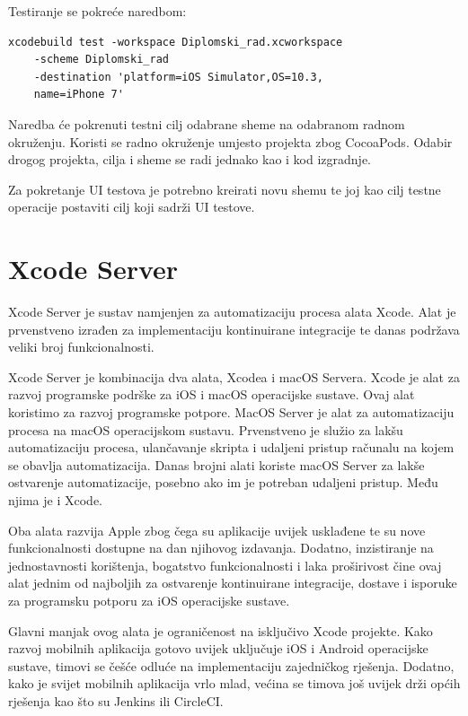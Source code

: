 \documentclass[times, utf8, diplomski, numeric]{fer}
\begin{document}
\begin{appendices}
Testiranje se pokreće naredbom:
\begin{verbatim}
xcodebuild test -workspace Diplomski_rad.xcworkspace
    -scheme Diplomski_rad
    -destination 'platform=iOS Simulator,OS=10.3,
    name=iPhone 7'
\end{verbatim}

Naredba će pokrenuti testni cilj odabrane sheme na odabranom radnom okruženju. Koristi se radno okruženje umjesto projekta zbog CocoaPods. Odabir drogog projekta, cilja i sheme se radi jednako kao i kod izgradnje.

Za pokretanje UI testova je potrebno kreirati novu shemu te joj kao cilj testne operacije postaviti cilj koji sadrži UI testove.

\chapter{Xcode Server}

Xcode Server je sustav namjenjen za automatizaciju procesa alata Xcode. Alat je prvenstveno izrađen za implementaciju kontinuirane integracije te danas podržava veliki broj funkcionalnosti.

Xcode Server je kombinacija dva alata, Xcodea i macOS Servera. Xcode je alat za razvoj programske podrške za iOS i macOS operacijske sustave. Ovaj alat koristimo za razvoj programske potpore. MacOS Server je alat za automatizaciju procesa na macOS operacijskom sustavu. Prvenstveno je služio za lakšu automatizaciju procesa, ulančavanje skripta i udaljeni pristup računalu na kojem se obavlja automatizacija. Danas brojni alati koriste macOS Server za lakše ostvarenje automatizacije, posebno ako im je potreban udaljeni pristup. Među njima je i Xcode.

Oba alata razvija Apple zbog čega su aplikacije uvijek usklađene te su nove funkcionalnosti dostupne na dan njihovog izdavanja. Dodatno, inzistiranje na jednostavnosti korištenja, bogatstvo funkcionalnosti i laka proširivost čine ovaj alat jednim od najboljih za ostvarenje kontinuirane integracije, dostave i isporuke za programsku potporu za iOS operacijske sustave.

Glavni manjak ovog alata je ograničenost na isključivo Xcode projekte. Kako razvoj mobilnih aplikacija gotovo uvijek uključuje iOS i Android operacijske sustave, timovi se češće odluće na implementaciju zajedničkog rješenja. Dodatno, kako je svijet mobilnih aplikacija vrlo mlad, većina se timova još uvijek drži općih rješenja kao što su Jenkins ili CircleCI.


\end{appendices}
\end{document}
